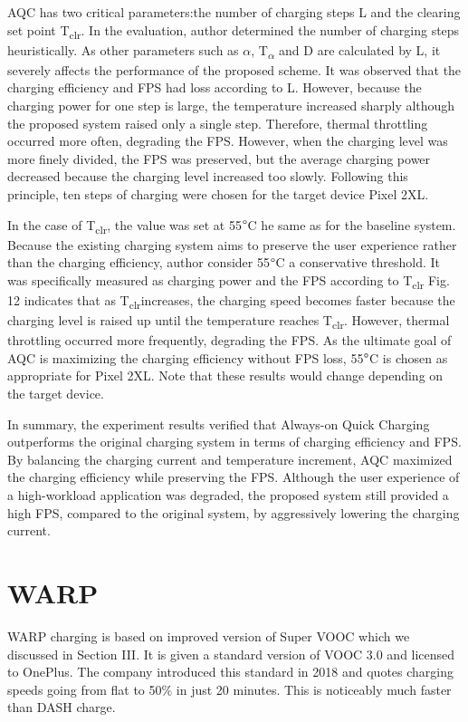 \documentclass[conference]{IEEEtran}
\begin{document}
AQC has two critical parameters:the number of charging steps L and the clearing set point T\textsubscript{clr}. In the evaluation, author\cite{b1} determined the number of charging steps heuristically. As other parameters such as $\alpha$, T\textsubscript{$\alpha$} and D are
calculated by L, it severely affects the performance of the proposed scheme. It was observed that the charging efficiency and FPS had loss according to L. However, because the charging power for one step
is large, the temperature increased sharply although the proposed system raised only a single step. Therefore, thermal throttling occurred more often, degrading the FPS. However,
when the charging level was more finely divided, the FPS was preserved, but the average charging power decreased because the charging level increased too slowly. Following this principle, ten steps of charging were chosen for the target device Pixel 2XL.

In the case of T\textsubscript{clr}, the value was set at 55$\degree$C he same as for the baseline system. Because the existing charging system aims to preserve the user experience rather than the charging efficiency, author\cite{b1} consider 55$\degree$C a conservative threshold. It was specifically measured as charging power and the FPS according to T\textsubscript{clr} Fig. 12 indicates that as T\textsubscript{clr}increases, the charging speed becomes faster because the charging level is raised up until the temperature reaches T\textsubscript{clr}. However, thermal throttling occurred more frequently, degrading the FPS. As the ultimate goal of AQC is maximizing the charging efficiency without FPS loss, 55$\degree$C is chosen as appropriate for Pixel 2XL. Note that these results would change depending on the target device\cite{b1}.

In summary, the experiment results verified that Always-on Quick Charging outperforms the original charging system in terms of charging efficiency and FPS. By balancing the charging current and temperature increment, AQC maximized the charging efficiency while preserving the FPS. Although the user experience of a high-workload application was degraded, the proposed system still provided a high FPS, compared to the
original system, by aggressively lowering the charging current.

\section{WARP}

WARP charging is based on improved version of Super VOOC which we discussed in Section III. It is given a standard version of VOOC 3.0 and licensed to OnePlus. The company introduced this standard in 2018 and
quotes charging speeds going from flat to 50\% in just 20 minutes. This is noticeably much faster than DASH charge. 
\end{document}
